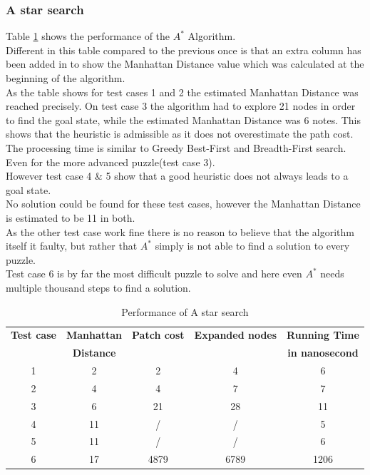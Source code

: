 \documentclass[journal]{IEEEtran}
\begin{document}
\subsubsection{A star search}
Table \ref{tab:astar} shows the performance of the $A^*$ Algorithm.\\
Different in this table compared to the previous once is that an extra column has been added in to show the Manhattan Distance value which was calculated at the beginning of the algorithm. \\
As the table shows for test cases 1 and 2 the estimated Manhattan Distance was reached precisely. On test case 3 the algorithm had to explore 21 nodes in order to find the goal state, while the estimated Manhattan Distance was 6 notes. This shows that the heuristic is admissible as it does not overestimate the path cost. \\
The processing time is similar to Greedy Best-First and Breadth-First search. Even for the more advanced puzzle(test case 3). \\

However test case 4 \& 5 show that a good heuristic does not always leads to a goal state. \\
No solution could be found for these test cases, however the Manhattan Distance is estimated to be 11 in both. \\
As the other test case work fine there is no reason to believe that the algorithm itself it faulty, but rather that $A^*$ simply is not able to find a solution to every puzzle. \\
Test case 6 is by far the most difficult puzzle to solve and here even $A^*$ needs multiple thousand steps to find a solution.\\


\begin{table}[h]
\renewcommand{\arraystretch}{1.3}
\centering
\caption{Performance of A star search}
\begin{tabular}{|c|c|c|c|c|}
\hline
\bfseries Test case & \bfseries Manhattan & \bfseries Patch cost & \bfseries Expanded nodes & \bfseries Running Time \\
 &\bfseries Distance & & &\bfseries in nanosecond\\\hline
1 & 2 & 2 & 4 & 6 \\
2 & 4 & 4 & 7 & 7 \\
3 & 6 & 21 & 28 & 11\\ 
4 & 11 & / & / &  5 \\
5 & 11 & / & /& 6 \\
6 & 17 & 4879 & 6789 & 1206 \\\hline
\end{tabular}
\label{tab:astar}
\end{table}
\end{document}
